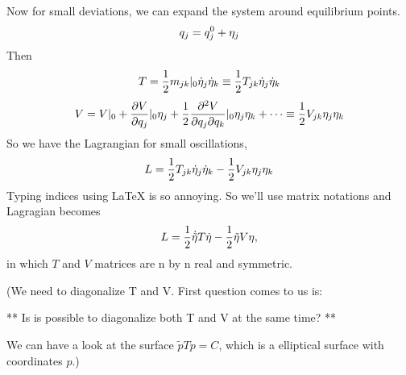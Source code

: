 \documentclass[letterpaper,10pt,english]{sphinxmanual}
\begin{document}
Now for small deviations, we can expand the system around equilibrium points.
\begin{gather}
\begin{split}q_j = q_j^0 + \eta _j\end{split}\notag
\end{gather}
Then
\begin{gather}
\begin{split}T = \frac{1}{2} m_{jk} \vert _ 0 \dot \eta _ j \dot \eta_k \equiv \frac{1}{2} T_{jk} \dot \eta _ j \dot \eta _k\end{split}\notag
\end{gather}\begin{gather}
\begin{split}V = V\vert _0 + \frac{\partial V}{\partial q_j}\vert _ 0 \eta_j + \frac{1}{2} \frac{\partial ^ 2 V}{\partial q_j \partial q_k} \vert _ 0 \eta _ j \eta _ k + \cdots \equiv \frac{1}{2} V_{jk}\eta _ j\eta _ k\end{split}\notag
\end{gather}
So we have the Lagrangian for small oscillations,
\begin{gather}
\begin{split}L = \frac{1}{2} T _ {jk} \dot \eta_j \dot \eta_k - \frac{1}{2} V_{jk}\eta_j \eta_k\end{split}\notag
\end{gather}
Typing indices using LaTeX is so annoying. So we'll use matrix notations and Lagragian becomes
\begin{gather}
\begin{split}L = \frac{1}{2} \dot {\tilde \eta} T \dot \eta - \frac{1}{2} \tilde \eta V \eta ,\end{split}\notag
\end{gather}
in which \(T\) and \(V\) matrices are n by n real and symmetric.

(We need to diagonalize T and V. First question comes to us is:

** Is is possible to diagonalize both T and V at the same time? **

We can have a look at the surface \(\tilde p T p = C\), which is a elliptical surface with coordinates \(p\).)
\end{document}
